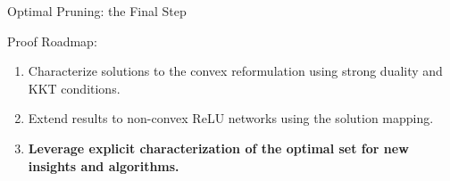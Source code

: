\documentclass[usenames,dvipsnames,mathserif,notheorems]{beamer}
\newcommand{\bad}[1]{\textcolor{bad}{#1}}
\newcommand{\good}[1]{\textcolor{good}{#1}}
\begin{document}
\begin{frame}{Optimal Pruning: the Final Step}

	{\Large Proof Roadmap:}
	\vspace{2em}
	\pause

	\begin{enumerate}
		\large
		\item Characterize solutions to the \good{convex reformulation}
		      using strong duality and KKT conditions.
		      \vspace{1ex}

		\item Extend results to \bad{non-convex} ReLU networks
		      using the solution mapping.
		      \vspace{1ex}

		\item \textbf{Leverage explicit characterization of the optimal
			      set for \good{new insights and algorithms}.}
	\end{enumerate}
\end{frame}
\end{document}
